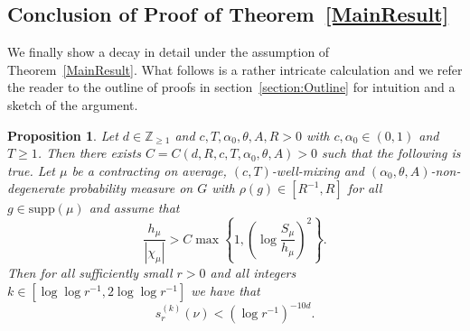 \documentclass[10pt, english,oneside,reqno]{amsart}
\theoremstyle{plain}
\newtheorem{proposition}[theorem]{Proposition}
\theoremstyle{remark}
\numberwithin{equation}{section}
\numberwithin{figure}{section}
\newcommand{\Z}{\mathbb{Z}}
\begin{document}
\subsection{Conclusion of Proof of Theorem~\ref{MainResult}}\label{section:ProofMain}

We finally show a decay in detail under the assumption of Theorem~\ref{MainResult}. What follows is a rather intricate calculation and we refer the reader to the outline of proofs in section~\ref{section:Outline} for intuition and a sketch of the argument.

\begin{proposition}\label{kDetailEstimate}
    Let $d \in \Z_{\geq 1}$ and $c, T, \alpha_0, \theta, A, R > 0$ with $c, \alpha_0 \in (0,1)$ and $T \geq 1$. Then there exists $C = C(d,R,c, T,\alpha_0,\theta, A) > 0$ such that the following is true. Let $\mu$ be a contracting on average, $(c,T)$-well-mixing and $(\alpha_0,\theta, A)$-non-degenerate probability measure on $G$ with $\rho(g) \in [R^{-1}, R]$ for all $g \in \mathrm{supp}(\mu)$ and assume that $$\frac{h_{\mu}}{|\chi_{\mu}|} > C \max\left\{ 1, \left(\log \frac{S_{\mu}}{h_{\mu}} \right)^2  \right\}.$$ Then for all sufficiently small $r > 0$ and all integers $k \in [\log \log r^{-1}, 2\log \log r^{-1}]$ we have that $$s_r^{(k)}(\nu) < (\log r^{-1})^{-10d}.$$
\end{proposition}
\end{document}
